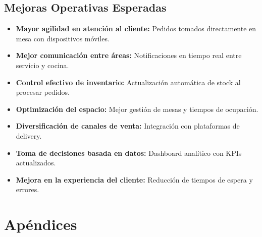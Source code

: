\documentclass[12pt]{article}
\begin{document}
\subsection{Mejoras Operativas Esperadas}
\begin{itemize}
  \item \textbf{Mayor agilidad en atención al cliente:} Pedidos tomados directamente en mesa con dispositivos móviles.
  \item \textbf{Mejor comunicación entre áreas:} Notificaciones en tiempo real entre servicio y cocina.
  \item \textbf{Control efectivo de inventario:} Actualización automática de stock al procesar pedidos.
  \item \textbf{Optimización del espacio:} Mejor gestión de mesas y tiempos de ocupación.
  \item \textbf{Diversificación de canales de venta:} Integración con plataformas de delivery.
  \item \textbf{Toma de decisiones basada en datos:} Dashboard analítico con KPIs actualizados.
  \item \textbf{Mejora en la experiencia del cliente:} Reducción de tiempos de espera y errores.
\end{itemize}

\section{Apéndices}
\end{document}
